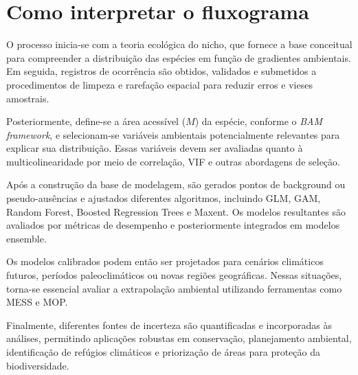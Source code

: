 \cleardoublepage

\section*{Como interpretar o fluxograma}

O processo inicia-se com a teoria ecológica do nicho, que fornece a base
conceitual para compreender a distribuição das espécies em função de gradientes
ambientais. Em seguida, registros de ocorrência são obtidos, validados e
submetidos a procedimentos de limpeza e rarefação espacial para reduzir erros
e vieses amostrais.

Posteriormente, define-se a área acessível ($M$) da espécie, conforme o
\textit{BAM framework}, e selecionam-se variáveis ambientais potencialmente
relevantes para explicar sua distribuição. Essas variáveis devem ser avaliadas
quanto à multicolinearidade por meio de correlação, VIF e outras abordagens de
seleção.

Após a construção da base de modelagem, são gerados pontos de background ou
pseudo-ausências e ajustados diferentes algoritmos, incluindo GLM, GAM,
Random Forest, Boosted Regression Trees e Maxent. Os modelos resultantes são
avaliados por métricas de desempenho e posteriormente integrados em modelos
ensemble.

Os modelos calibrados podem então ser projetados para cenários climáticos
futuros, períodos paleoclimáticos ou novas regiões geográficas. Nessas
situações, torna-se essencial avaliar a extrapolação ambiental utilizando
ferramentas como MESS e MOP.

Finalmente, diferentes fontes de incerteza são quantificadas e incorporadas
às análises, permitindo aplicações robustas em conservação, planejamento
ambiental, identificação de refúgios climáticos e priorização de áreas para
proteção da biodiversidade.

\begin{center}
\end{center}

